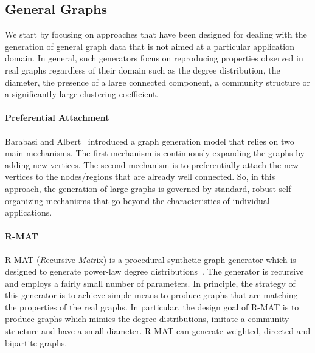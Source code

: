 \subsection{General Graphs}
\label{sec:generators_general}

We start by focusing on approaches that have been designed for dealing with the
generation of general graph data that is not aimed at a particular application
domain. In general, such generators focus on reproducing properties observed in
real graphs regardless of their domain such as the degree distribution, the
diameter, the presence of a large connected component, a community structure or
a significantly large clustering coefficient.



\paragraph {Preferential Attachment} Barabasi and
Albert~\cite{Barabasi99emergenceScaling} introduced a graph generation model
that relies on two main mechanisms. The first mechanism is continuously
expanding the graphs by adding new vertices. The second mechanism is to
preferentially attach the new vertices   to the nodes/regions that are already
well connected. So, in this approach, the generation of large graphs is governed
by standard, robust self-organizing mechanisms that go beyond the
characteristics of individual applications.

\paragraph {R-MAT} R-MAT (\emph{R}ecursive \emph{Mat}rix) is a procedural
synthetic graph generator which is designed to generate power-law degree
distributions~\cite{DBLP:conf/sdm/ChakrabartiZF04}.  The generator is recursive
and employs a fairly small number of parameters.  In principle, the strategy of
this generator is to achieve simple means to produce graphs that are matching
the properties of the real graphs. In particular, the design goal of R-MAT is to
produce graphs which mimics the degree distributions, imitate a community
structure and have a small diameter. R-MAT can generate weighted, directed and
bipartite graphs.


